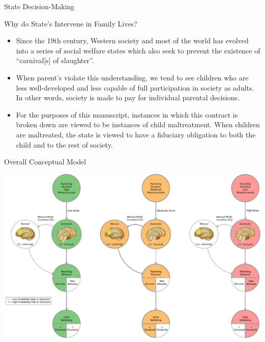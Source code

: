 \documentclass[handout]{beamer}
\begin{document}
\begin{frame}{State Decision-Making}

\begin{block}{Why do State's Intervene in Family Lives?}

\begin{itemize}[<+->]
\itemsep1pt\parskip0pt
\item
  Since the 19th century, Western society and most of the world has
  evolved into a series of social welfare states which also seek to
  prevent the existence of ``carnival{[}s{]} of slaughter''.
\end{itemize}

\begin{itemize}[<+->]
\itemsep1pt\parskip0pt
\item
  When parent's violate this understanding, we tend to see children who
  are less well-developed and less capable of full participation in
  society as adults. In other words, society is made to pay for
  individual parental decisions.
\end{itemize}

\begin{itemize}[<+->]
\itemsep1pt\parskip0pt
\item
  For the purposes of this manuscript, instances in which this contract
  is broken down are viewed to be instances of child maltreatment. When
  children are maltreated, the state is viewed to have a fiduciary
  obligation to both the child and to the rest of society.
\end{itemize}

\end{block}

\end{frame}

\begin{frame}{Overall Conceptual Model}

\includegraphics[scale=0.3]{general_conceptual_model_flow.pdf}

\end{frame}
\end{document}
